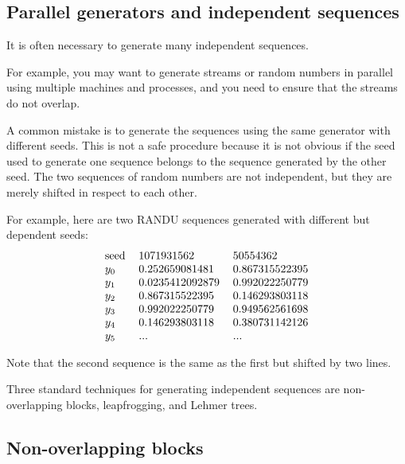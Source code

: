 \documentclass[justified, sixbynine]{tufte-book}
\theoremstyle{plain}%
\newtheorem * {corollary}{Corollary}
\theoremstyle{definition}
\theoremstyle{remark}
\newtheorem * {remark}{Remark}
\newtheorem * {note}{Note}
\begin{document}
\begin{fullwidth}
\goodbreak\section{Parallel generators and independent sequences}

It is often necessary to generate many independent sequences.

For example, you may want to generate streams or random numbers in parallel using multiple machines and processes, and you need to ensure that the streams do not overlap.

A common mistake is to generate the sequences using the same
generator with different seeds. This is not a safe procedure because it is
not obvious if the seed used to generate one sequence belongs to the
sequence generated by the other seed. The two
sequences of random numbers are not independent, but they are merely
shifted in respect to each other.

For example, here are two RANDU sequences generated with different but dependent
seeds:
\begin{equation}
\begin{tabular}{lll}
seed & 1071931562 & 50554362 \\
$y_0$ & 0.252659081481 & 0.867315522395 \\
$y_1$ & 0.0235412092879 & 0.992022250779 \\
$y_2$ & 0.867315522395 & 0.146293803118 \\
$y_3$ & 0.992022250779 & 0.949562561698 \\
$y_4$ & 0.146293803118 & 0.380731142126 \\
$y_5$ & ... & ...
\end{tabular}
\end{equation}

Note that the second sequence is the same as the first but shifted by two
lines.

Three standard techniques for generating independent sequences are
non-overlapping blocks, leapfrogging, and Lehmer trees.

\goodbreak\subsection{Non-overlapping blocks}


\end{fullwidth}
\end{document}

